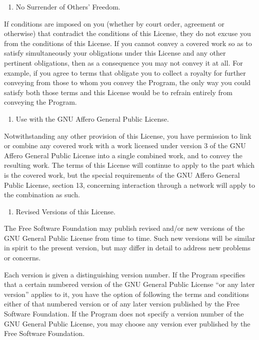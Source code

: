 \documentclass[11pt]{article}
\begin{document}
\begin{enumerate}
\item No Surrender of Others' Freedom.
\end{enumerate}
If conditions are imposed on you (whether by court order, agreement or otherwise) that contradict the conditions of this License, they do not excuse you from the conditions of this License. If you cannot convey a covered work so as to satisfy simultaneously your obligations under this License and any other pertinent obligations, then as a consequence you may not convey it at all. For example, if you agree to terms that obligate you to collect a royalty for further conveying from those to whom you convey the Program, the only way you could satisfy both those terms and this License would be to refrain entirely from conveying the Program.

\begin{enumerate}
\item Use with the GNU Affero General Public License.
\end{enumerate}
Notwithstanding any other provision of this License, you have permission to link or combine any covered work with a work licensed under version 3 of the GNU Affero General Public License into a single combined work, and to convey the resulting work. The terms of this License will continue to apply to the part which is the covered work, but the special requirements of the GNU Affero General Public License, section 13, concerning interaction through a network will apply to the combination as such.

\begin{enumerate}
\item Revised Versions of this License.
\end{enumerate}
The Free Software Foundation may publish revised and/or new versions of the GNU General Public License from time to time. Such new versions will be similar in spirit to the present version, but may differ in detail to address new problems or concerns.

Each version is given a distinguishing version number. If the Program specifies that a certain numbered version of the GNU General Public License “or any later version” applies to it, you have the option of following the terms and conditions either of that numbered version or of any later version published by the Free Software Foundation. If the Program does not specify a version number of the GNU General Public License, you may choose any version ever published by the Free Software Foundation.
\end{document}
